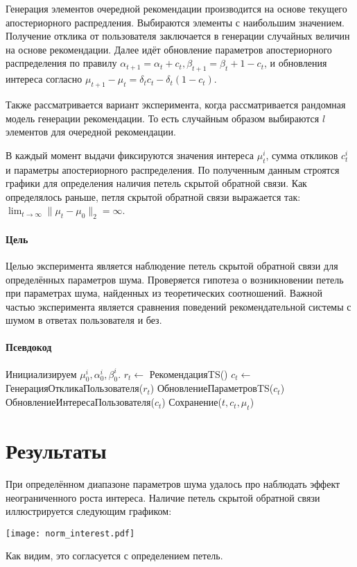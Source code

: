 \documentclass[12pt, twoside]{article}
\begin{document}
Генерация элементов очередной рекомендации производится на основе текущего апостериорного распредления. 
Выбираются элементы с наибольшим значением. 
Получение отклика от пользователя заключается в генерации случайных величин на основе рекомендации.
Далее идёт обновление параметров апостериорного распределения по правилу $\alpha_{t+1} = \alpha_t + c_t, \beta_{t+1} = \beta_t + 1 - c_t$, и обновления интереса согласно 
$\mu_{t+1} - \mu_{t} = \delta_t c_t - \delta_t (1 - c_t)$.

Также рассматривается вариант эксперимента, когда рассматривается рандомная модель генерации рекомендации. То есть случайным образом выбираются $l$ элементов для очередной рекомендации. 

В каждый момент выдачи фиксируются значения интереса $\mu_t^i$, сумма откликов $c_t^i$ и параметры апостериорного распределения. 
По полученным данным строятся графики для определения наличия петель скрытой обратной связи.
Как определялось раньше, петля скрытой обратной связи выражается так: $\lim_{t \to \infty} \|\mu_t - \mu_0 \|_2 = \infty$.

\paragraph{Цель}
Целью эксперимента является наблюдение петель скрытой обратной связи для определённых параметров шума. 
Проверяется гипотеза о возникновении петель при параметрах шума, найденных из теоретических соотношений. 
Важной частью эксперимента является сравнения поведений рекомендательной системы с шумом в ответах пользователя и без. 

\paragraph{Псевдокод}
\begin{algorithmic}
  \STATE Инициализируем $\mu_0^i, \alpha_0^i, \beta_0^i$.
    \STATE $r_t \leftarrow$ РекомендацияTS()
    \STATE $c_t \leftarrow$ ГенерацияОткликаПользователя($r_t$)
    \STATE ОбновлениеПараметровTS($c_t$)
    \STATE ОбновлениеИнтересаПользователя($c_t$)
    \STATE Сохранение($t, c_t, \mu_t$)
  \ENDFOR
\end{algorithmic}

\section{Результаты}
При определённом диапазоне параметров шума удалось про наблюдать эффект неограниченного роста интереса. 
Наличие петель скрытой обратной связи иллюстрируется следующим графиком: 
\begin{center}
  \texttt{[image: norm\_interest.pdf]}
\end{center}
Как видим, это согласуется с определением петель. 
\end{document}
